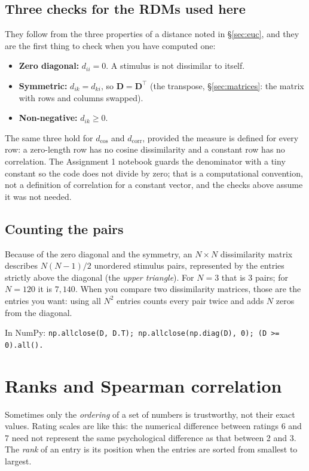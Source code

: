 \documentclass[11pt]{article}
\newcommand{\mD}{\bm{D}}
\newcommand{\dcos}{d_{\cos}}
\newcommand{\dcorr}{d_{\mathrm{corr}}}
\newcommand{\np}[1]{{\small\color{lightgray}In NumPy: \texttt{#1}}\par}
\begin{document}
\subsection{Three checks for the RDMs used here}

They follow from the three properties of a distance noted in \S\ref{sec:euc}, and they are
the first thing to check when you have computed one:
\begin{itemize}
\item \textbf{Zero diagonal:} $d_{ii} = 0$. A stimulus is not dissimilar to itself.
\item \textbf{Symmetric:} $d_{ik} = d_{ki}$, so $\mD = \mD^{\top}$ (the transpose,
      \S\ref{sec:matrices}: the matrix with rows and columns swapped).
\item \textbf{Non-negative:} $d_{ik} \geq 0$.
\end{itemize}
The same three hold for $\dcos$ and $\dcorr$, provided the measure is defined for every
row: a zero-length row has no cosine dissimilarity and a constant row has no correlation.
The Assignment 1 notebook guards the denominator with a tiny constant so the code does not
divide by zero; that is a computational convention, not a definition of correlation for a
constant vector, and the checks above assume it was not needed.

\subsection{Counting the pairs}

Because of the zero diagonal and the symmetry, an $N \times N$ dissimilarity matrix
describes $N(N-1)/2$ unordered stimulus pairs, represented by the entries strictly above
the diagonal (the \emph{upper triangle}). For $N = 3$ that is $3$ pairs; for $N = 120$ it
is $7{,}140$. When you compare two dissimilarity matrices, those are the entries you want:
using all $N^2$ entries counts every pair twice and adds $N$ zeros from the diagonal.

\np{np.allclose(D, D.T); np.allclose(np.diag(D), 0); (D >= 0).all().}

\section{Ranks and Spearman correlation}
\label{sec:spearman}

Sometimes only the \emph{ordering} of a set of numbers is trustworthy, not their exact
values. Rating scales are like this: the numerical difference between ratings 6 and 7 need
not represent the same psychological difference as that between 2 and 3. The \emph{rank}
of an entry is its position when the entries are sorted from smallest to largest.
\end{document}
